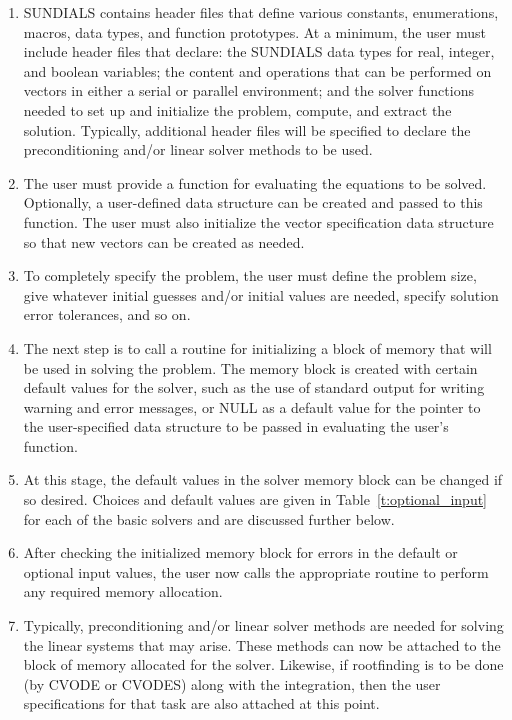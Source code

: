 \begin{enumerate}

\item \label{sun_headers}
SUNDIALS contains header files that define various constants,
enumerations, macros, data types, and function prototypes.  At a
minimum, the user must include header files that declare: the SUNDIALS
data types for real, integer, and boolean variables; the content and
operations that can be performed on vectors in either a serial or
parallel environment; and the solver functions needed to
set up and initialize the problem, compute, and extract the solution. 
Typically, additional header files will be specified to declare the 
preconditioning and/or linear solver methods to be used.

\item \label{sun_problem}
The user must provide a function for evaluating the equations to be
solved. Optionally, a user-defined data structure can be created and
passed to this function. The user must also initialize the vector
specification data structure so that new vectors can be created as needed.

\item \label{sun_size}
To completely specify the problem, the user must define the problem
size, give whatever initial guesses and/or initial values are
needed, specify solution error tolerances, and so on. 

\item \label{sun_create}
The next step is to call a routine for initializing a block of memory
that will be used in solving the problem. The memory block is created
with certain default values for the solver, such as the use of
standard output for writing warning and error messages, or NULL
as a default value for the pointer to the user-specified data
structure to be passed in evaluating the user's function.

\item \label{sun_set}
At this stage, the default values in the solver memory block can be
changed if so desired. Choices and default values are given in
Table~\ref{t:optional_input} for each of the basic solvers and
are discussed further below.

\item \label{sun_malloc}
After checking the initialized memory block for
errors in the default or optional input values, the user now calls 
the appropriate routine to perform any required
memory allocation.

\item \label{sun_linear}
Typically, preconditioning and/or linear solver methods are needed for
solving the linear systems that may arise. These methods can now be
attached to the block of memory allocated for the solver.  Likewise,
if rootfinding is to be done (by CVODE or CVODES) along with the
integration, then the user specifications for that task are also
attached at this point.


\end{enumerate}
